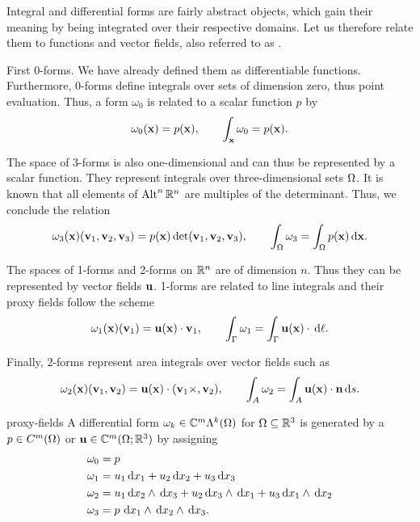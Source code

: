 \begin{remark}
  \label{remark:proxy-fields}
  Integral and differential forms are fairly abstract objects, which
  gain their meaning by being integrated over their respective
  domains. Let us therefore relate them to functions and vector
  fields, also referred to as .

  First 0-forms. We have already defined them as differentiable
  functions. Furthermore, 0-forms define integrals over sets of
  dimension zero, thus point evaluation.
  Thus, a form $\omega_0$ is related to a scalar function $p$ by
  \begin{gather}
    \omega_0(\mathbf x) = p(\mathbf x),\qquad \int_\mathbf x \omega_0 = p(\mathbf x).
  \end{gather}

  The space of 3-forms is also one-dimensional and can thus be
  represented by a scalar function. They represent integrals over
  three-dimensional sets $\Omega$. It is known that all elements of
  $\operatorname{Alt}^n\mathbb R^n$ are multiples of the determinant. Thus, we conclude the
  relation
  \begin{gather}
    \omega_3(\mathbf x)(\mathbf v_1,\mathbf v_2,\mathbf v_3) = p(\mathbf x) \det(\mathbf v_1,\mathbf v_2,\mathbf v_3)
    ,\qquad \int_\Omega \omega_3 = \int_\Omega p(\mathbf x) \,\mathrm{d} \mathbf x.
  \end{gather}

  The spaces of 1-forms and 2-forms on $\mathbb R^n$ are of dimension
  $n$. Thus they can be represented by vector fields $\mathbf u$. 1-forms are
  related to line integrals and their proxy fields follow the scheme
  \begin{gather}
    \omega_1(\mathbf x)(\mathbf v_1) = \mathbf u(\mathbf x) \cdot \mathbf v_1
    ,\qquad \int_\Gamma \omega_1 = \int_\Gamma \mathbf u(\mathbf x) \cdot \,\mathrm{d} \ell.
  \end{gather}

  Finally, 2-forms represent area integrals over vector fields such as
  \begin{gather}
    \omega_2(\mathbf x)(\mathbf v_1,\mathbf v_2) = \mathbf u(\mathbf x) \cdot (\mathbf v_1 \times ,\mathbf v_2)
    ,\qquad \int_A \omega_2 = \int_A \mathbf u(\mathbf x) \cdot \mathbf n \,\mathrm{d} s.
  \end{gather}
\end{remark}

\begin{Definition}{proxy-fields}
  A differential form $\omega_k \in \mathbb C^m\Lambda^k(\Omega)$ for
  $\Omega \subseteq \mathbb R^3$ is generated by a 
  $p\in C^m(\Omega)$ or $\mathbf u\in\mathbb C^m(\Omega;\mathbb R^3)$ by assigning
  \begin{align}
    \omega_0 &= p\\
    \omega_1 &= u_1 \,\mathrm{d} x_1 + u_2 \,\mathrm{d} x_2 + u_3 \,\mathrm{d} x_3\\
    \omega_2 &= u_1 \,\mathrm{d} x_2\wedge \,\mathrm{d} x_3 + u_2 \,\mathrm{d} x_3 \wedge \,\mathrm{d} x_1 + u_3 \,\mathrm{d} x_1 \wedge \,\mathrm{d} x_2\\
    \omega_3 &= p \, \,\mathrm{d} x_1 \wedge \,\mathrm{d} x_2 \wedge \,\mathrm{d} x_3.
  \end{align}
\end{Definition}

